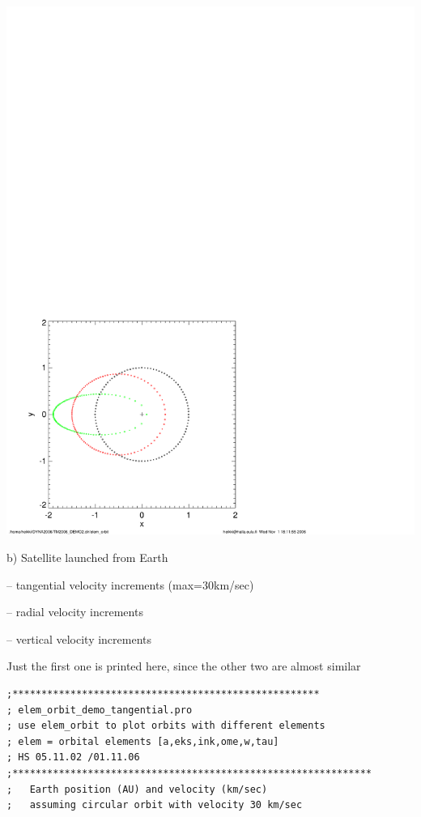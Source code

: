 \documentclass[a4paper,12pt]{article}
\def\red{\color{red}}
\def\black{\color{RGBblack}}
\begin{document}
{{{\vspace{-14cm}
\includegraphics[width=1\paperwidth]{elem_orbit.pdf}






\newpage
\black
{\medb b) Satellite launched from Earth} 


\bul {}  -- tangential velocity increments (max=30km/sec)

\bul {}  -- radial velocity increments 

\bul {}  -- vertical velocity increments


Just the first one is printed here, since the other two are almost similar


{\red \scriptsize
\begin{verbatim}
;*****************************************************
; elem_orbit_demo_tangential.pro
; use elem_orbit to plot orbits with different elements
; elem = orbital elements [a,eks,ink,ome,w,tau]
; HS 05.11.02 /01.11.06
;**************************************************************
;   Earth position (AU) and velocity (km/sec)
;   assuming circular orbit with velocity 30 km/sec


\end{verbatim}}}}}
\end{document}
